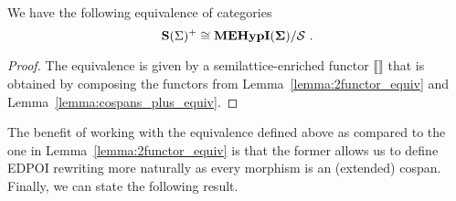 \begin{theorem}
	\label{thm:completeness_simple}
	We have the following equivalence of categories
	\[
		\mathbf{S}(\Sigma)^{+} \cong {\mathbf{MEHypI(\Sigma)}} / \mathcal{S}~.
	\]	
	\end{theorem}
\begin{proof}
	The equivalence is given by a semilattice-enriched functor $\llbracket \rrbracket$ that is obtained by composing the functors from Lemma~\ref{lemma:2functor_equiv} and Lemma~\ref{lemma:cospans_plus_equiv}.
\end{proof}
The benefit of working with the equivalence defined above as compared to the one in Lemma~\ref{lemma:2functor_equiv} is that the former allows us to define EDPOI rewriting more naturally as every morphism is an (extended) cospan.
Finally, we can state the following result.





